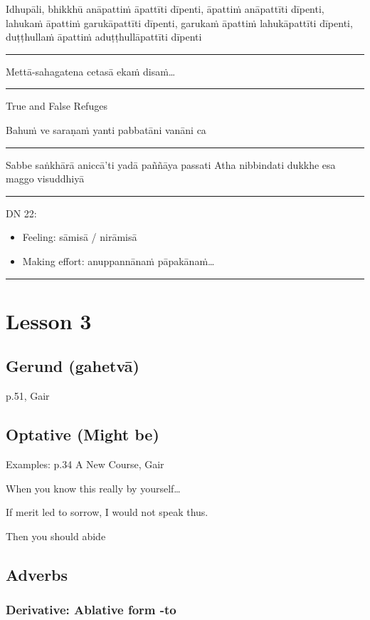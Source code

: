 \documentclass[11pt,oneside]{memoir}
\begin{document}
Idhupāli, bhikkhū anāpattiṁ āpattīti dīpenti, āpattiṁ anāpattīti dīpenti, lahukaṁ āpattiṁ garukāpattīti dīpenti, garukaṁ āpattiṁ lahukāpattīti dīpenti, duṭṭhullaṁ āpattiṁ aduṭṭhullāpattīti dīpenti

\noindent\rule{\textwidth}{0.5pt}

Mettā-sahagatena cetasā ekaṁ disaṁ\ldots{}

\noindent\rule{\textwidth}{0.5pt}

True and False Refuges

Bahuṁ ve saraṇaṁ yanti pabbatāni vanāni ca

\noindent\rule{\textwidth}{0.5pt}

Sabbe saṅkhārā aniccā’ti yadā paññāya passati
Atha nibbindati dukkhe esa maggo visuddhiyā

\noindent\rule{\textwidth}{0.5pt}

DN 22:
\begin{itemize}
\item Feeling: sāmisā / nirāmisā
\item Making effort: anuppannānaṁ pāpakānaṁ\ldots{}
\end{itemize}

\noindent\rule{\textwidth}{0.5pt}

\chapter{Lesson 3}
\label{sec:org879f16e}
\section{Gerund (gahetvā)}
\label{sec:orga88165b}

p.51, Gair

\section{Optative (Might be)}
\label{sec:org05f9a3e}

Examples: p.34 A New Course, Gair

When you know this really by yourself\ldots{}

If merit led to sorrow, I would not speak thus.

Then you should abide

\section{Adverbs}
\label{sec:org415d69e}
\subsection{Derivative: Ablative form -to}
\label{sec:orgc63b995}
\end{document}
